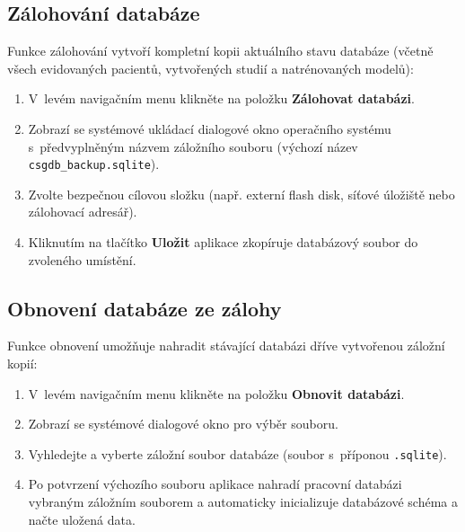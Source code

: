 \documentclass[12pt,a4paper]{article}
\begin{document}
\subsection{Zálohování databáze}

Funkce zálohování vytvoří kompletní kopii aktuálního stavu databáze (včetně všech evidovaných pacientů, vytvořených studií a natrénovaných modelů):

\begin{enumerate}
    \item V~levém navigačním menu klikněte na položku \textbf{Zálohovat databázi}.
    \item Zobrazí se systémové ukládací dialogové okno operačního systému s~předvyplněným názvem záložního souboru (výchozí název \texttt{csgdb\_backup.sqlite}).
    \item Zvolte bezpečnou cílovou složku (např. externí flash disk, síťové úložiště nebo zálohovací adresář).
    \item Kliknutím na tlačítko \textbf{Uložit} aplikace zkopíruje databázový soubor do zvoleného umístění.
\end{enumerate}

\subsection{Obnovení databáze ze zálohy}

Funkce obnovení umožňuje nahradit stávající databázi dříve vytvořenou záložní kopií:

\begin{enumerate}
    \item V~levém navigačním menu klikněte na položku \textbf{Obnovit databázi}.
    \item Zobrazí se systémové dialogové okno pro výběr souboru.
    \item Vyhledejte a vyberte záložní soubor databáze (soubor s~příponou \texttt{.sqlite}).
    \item Po potvrzení výchozího souboru aplikace nahradí pracovní databázi vybraným záložním souborem a automaticky inicializuje databázové schéma a načte uložená data.
\end{enumerate}
\end{document}
